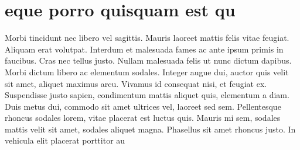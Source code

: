 \section{eque porro quisquam est qu}
Morbi tincidunt nec libero vel sagittis. Mauris laoreet mattis felis vitae feugiat. Aliquam erat volutpat. Interdum et malesuada fames ac ante ipsum primis in faucibus. Cras nec tellus justo. Nullam malesuada felis ut nunc dictum dapibus. Morbi dictum libero ac elementum sodales. Integer augue dui, auctor quis velit sit amet, aliquet maximus arcu. Vivamus id consequat nisi, et feugiat ex. Suspendisse justo sapien, condimentum mattis aliquet quis, elementum a diam. Duis metus dui, commodo sit amet ultrices vel, laoreet sed sem. Pellentesque rhoncus sodales lorem, vitae placerat est luctus quis. Mauris mi sem, sodales mattis velit sit amet, sodales aliquet magna. Phasellus sit amet rhoncus justo. In vehicula elit placerat porttitor au
\begin{figure}[H]
\end{figure}
